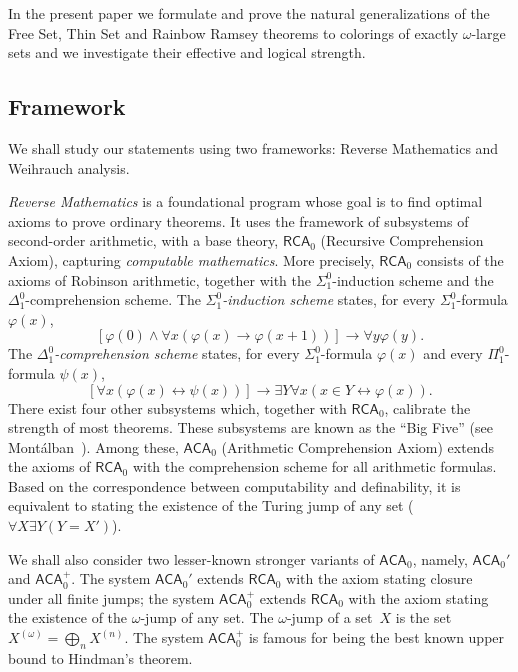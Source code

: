\documentclass[10pt,a4paper]{article}
\newcommand{\RCA}[0]{\mathsf{RCA}}
\newcommand{\ACA}[0]{\mathsf{ACA}}
\def\qt#1{``#1''}%
\numberwithin{theorem}{section}
\begin{document}
In the present paper we formulate and prove the natural generalizations of the Free Set, Thin Set and Rainbow Ramsey theorems to colorings of exactly $\omega$-large sets and we investigate their effective and logical strength. 

\subsection{Framework}
We shall study our statements using two frameworks: Reverse Mathematics and Weihrauch analysis.

\emph{Reverse Mathematics} is a foundational program whose goal is to find optimal axioms to prove ordinary theorems. It uses the framework of subsystems of second-order arithmetic, with a base theory, $\RCA_0$ (Recursive Comprehension Axiom), capturing \emph{computable mathematics}. More precisely, $\RCA_0$ consists of the axioms of Robinson arithmetic, together with the $\Sigma^0_1$-induction scheme and the $\Delta^0_1$-comprehension scheme.
The \emph{$\Sigma^0_1$-induction scheme} states, for every $\Sigma^0_1$-formula $\varphi(x)$,
$$
[\varphi(0) \wedge \forall x (\varphi(x) \rightarrow \varphi(x+1))] \rightarrow \forall y \varphi(y).
$$
The \emph{$\Delta^0_1$-comprehension scheme} states, for every $\Sigma^0_1$-formula $\varphi(x)$ and every $\Pi^0_1$-formula $\psi(x)$,
$$
[\forall x(\varphi(x) \leftrightarrow \psi(x))] \rightarrow \exists Y \forall x (x \in Y \leftrightarrow \varphi(x)).
$$
There exist four other subsystems which, together with $\RCA_0$, calibrate the strength of most theorems. These subsystems are known as the \qt{Big Five} (see Mont\'alban~\cite{montalban_open_2011}). Among these, $\ACA_0$ (Arithmetic Comprehension Axiom) extends the axioms of $\RCA_0$ with the comprehension scheme for all arithmetic formulas. Based on the correspondence between computability and definability, it is equivalent to stating the existence of the Turing jump of any set ($\forall X \exists Y (Y = X')$).

We shall also consider two lesser-known stronger variants of $\ACA_0$, namely, $\ACA_0'$ and $\ACA_0^+$. The system $\ACA_0'$ extends $\RCA_0$ with the axiom stating closure under all finite jumps; the system $\ACA_0^+$ extends $\RCA_0$ with the axiom stating the existence of the $\omega$-jump of any set. The $\omega$-jump of a set~$X$ is the set $X^{(\omega)} = \bigoplus_n X^{(n)}$. The system $\ACA_0^+$ is famous for being the best known upper bound to Hindman's theorem.%
\end{document}

